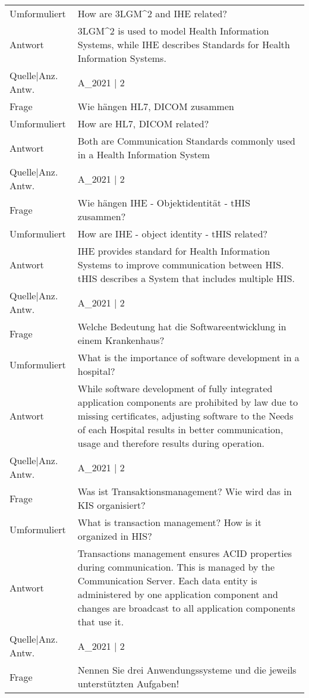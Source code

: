{\begin{landscape}
\begin{longtable}{p{3cm}p{}}
    Umformuliert & How are 3LGM\textasciicircum{}2 and IHE related? \\
    Antwort & 3LGM\textasciicircum{}2 is used to model Health Information Systems, while IHE describes Standards for Health Information Systems.\\
    Quelle|Anz. Antw. &  A\_2021  | 2 \\
    \midrule
    Frage & Wie hängen HL7, DICOM zusammen \\
    Umformuliert & How are HL7, DICOM related? \\
    Antwort & Both are Communication Standards commonly used in a Health Information System \\
    Quelle|Anz. Antw. &  A\_2021  | 2 \\
    \midrule
    Frage & Wie hängen IHE - Objektidentität - tHIS zusammen? \\
    Umformuliert & How are IHE - object identity - tHIS related? \\
    Antwort & IHE provides standard for Health Information Systems to improve communication between HIS.
    tHIS describes a System that includes multiple HIS.\\
    Quelle|Anz. Antw. &  A\_2021  | 2 \\
    \midrule
    Frage & Welche Bedeutung hat die Softwareentwicklung in einem Krankenhaus? \\
    Umformuliert & What is the importance of software development in a hospital? \\
    Antwort & While software development of fully integrated application components are prohibited by law due to missing certificates, adjusting software to the Needs of each Hospital results in better communication, usage and therefore results during operation.\\
    Quelle|Anz. Antw. &  A\_2021  | 2 \\
    \midrule
    Frage & Was ist Transaktionsmanagement? Wie wird das in KIS organisiert? \\
    Umformuliert & What is transaction management? How is it organized in HIS? \\
    Antwort & Transactions management ensures ACID properties during communication.
    This is managed by the Communication Server.
    Each data entity is administered by one application component and changes are broadcast to all application components that use it.\\
    Quelle|Anz. Antw. &  A\_2021  | 2 \\
    \midrule
    Frage & Nennen Sie drei Anwendungssysteme und die jeweils unterstützten Aufgaben! \\

\end{longtable}
\end{landscape}}
